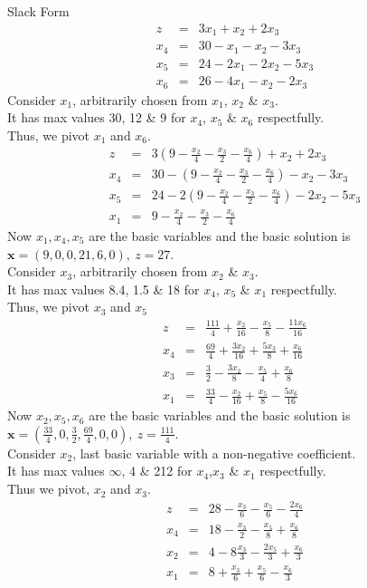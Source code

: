 \documentclass[11pt,a4paper]{article}
\begin{document}
Slack Form
\[\begin{array}{rcl}
z&=&3x_1+x_2+2x_3\\
x_4&=&30-x_1-x_2-3x_3\\
x_5&=&24-2x_1-2x_2-5x_3\\
x_6&=&26-4x_1-x_2-2x_3
\end{array}\]
Consider $x_1$, arbitrarily chosen from $x_1$, $x_2$ \& $x_3$.\\
It has max values 30, 12 \& 9 for $x_4$, $x_5$ \& $x_6$ respectfully.\\
Thus, we pivot $x_1$ and $x_6$.
\[\begin{array}{rcl}
z&=&3\left(9-\frac{x_2}{4}-\frac{x_3}{2}-\frac{x_6}{4}\right)+x_2+2x_3\\
x_4&=&30-\left(9-\frac{x_2}{4}-\frac{x_3}{2}-\frac{x_6}{4}\right)-x_2-3x_3\\
x_5&=&24-2\left(9-\frac{x_2}{4}-\frac{x_3}{2}-\frac{x_6}{4}\right)-2x_2-5x_3\\
x_1&=&9-\frac{x_2}{4}-\frac{x_3}{2}-\frac{x_6}{4}
\end{array}\]
Now $x_1,x_4,x_5$ are the basic variables and the basic solution is $\textbf{x}=(9,0,0,21,6,0),\ z=27$.\\
Consider $x_3$, arbitrarily chosen from $x_2$ \& $x_3$.\\
It has max values 8.4, 1.5 \& 18 for $x_4$, $x_5$ \& $x_1$ respectfully.\\
Thus, we pivot $x_3$ and $x_5$\\
\[\begin{array}{rcl}
z&=&\frac{111}{4}+\frac{x_2}{16}-\frac{x_5}{8}-\frac{11x_6}{16}\\
x_4&=&\frac{69}{4}+\frac{3x_2}{16}+\frac{5x_3}{8}+\frac{x_6}{16}\\
x_3&=&\frac{3}{2}-\frac{3x_2}{8}-\frac{x_5}{4}+\frac{x_6}{8}\\
x_1&=&\frac{33}{4}-\frac{x_2}{16}+\frac{x_5}{8}-\frac{5x_6}{16}
\end{array}\]
Now $x_2,x_5,x_6$ are the basic variables and the basic solution is $\textbf{x}=(\frac{33}{4},0,\frac{3}{2},\frac{69}{4},0,0),\ z=\frac{111}{4}$.\\
Consider $x_2$, last basic variable with a non-negative coefficient.\\
It has max values $\infty$, 4 \& 212 for $x_4$,$x_3$ \& $x_1$ respectfully.\\
Thus we pivot, $x_2$ and $x_3$.
\[\begin{array}{rcl}
z&=&28-\frac{x_3}{6}-\frac{x_5}{6}-\frac{2x_6}{4}\\
x_4&=&18-\frac{x_3}{2}-\frac{x_5}{8}+\frac{x_6}{8}\\
x_2&=&4-8\frac{x_3}{3}-\frac{2x_5}{3}+\frac{x_6}{3}\\
x_1&=&8+\frac{x_3}{6}+\frac{x_5}{6}-\frac{x_6}{3}
\end{array}\]
\end{document}
